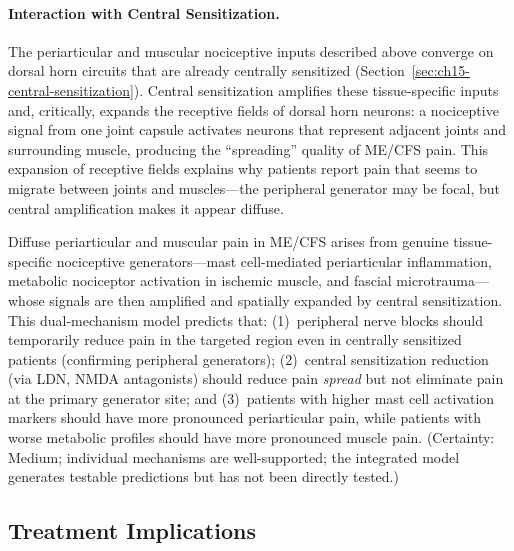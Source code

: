 \paragraph{Interaction with Central Sensitization.}
The periarticular and muscular nociceptive inputs described above converge on dorsal horn circuits that are already centrally sensitized (Section~\ref{sec:ch15-central-sensitization}). Central sensitization amplifies these tissue-specific inputs and, critically, expands the receptive fields of dorsal horn neurons: a nociceptive signal from one joint capsule activates neurons that represent adjacent joints and surrounding muscle, producing the ``spreading'' quality of ME/CFS pain. This expansion of receptive fields explains why patients report pain that seems to migrate between joints and muscles---the peripheral generator may be focal, but central amplification makes it appear diffuse.

\begin{hypothesis}
\label{hyp:ch15-tissue-specific-pain}
Diffuse periarticular and muscular pain in ME/CFS arises from genuine tissue-specific nociceptive generators---mast cell-mediated periarticular inflammation, metabolic nociceptor activation in ischemic muscle, and fascial microtrauma---whose signals are then amplified and spatially expanded by central sensitization. This dual-mechanism model predicts that: (1)~peripheral nerve blocks should temporarily reduce pain in the targeted region even in centrally sensitized patients (confirming peripheral generators); (2)~central sensitization reduction (via LDN, NMDA antagonists) should reduce pain \emph{spread} but not eliminate pain at the primary generator site; and (3)~patients with higher mast cell activation markers should have more pronounced periarticular pain, while patients with worse metabolic profiles should have more pronounced muscle pain. (Certainty: Medium; individual mechanisms are well-supported; the integrated model generates testable predictions but has not been directly tested.)
\end{hypothesis}

\subsection{Treatment Implications}

